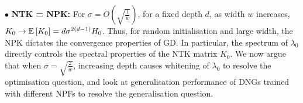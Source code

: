 $\bullet$ \textbf{NTK = NPK:} For $\sigma=O\left(\sqrt{\frac{1}{w}}\right)$, for a fixed depth $d$, as width $w$ increases, $K_0\rightarrow\mathbb{E}\left[K_0\right]=d\sigma^{2(d-1)}H_0$. Thus, for random initialisation and large width, the NPK dictates the convergence properties of GD. In particular, the spectrum of $\lambda_0$ directly controls the spectral properties of the NTK matrix $K_0$. We now argue that when $\sigma=\sqrt{\frac{2}{w}}$, increasing depth causes whitening of $\lambda_0$ to resolve the optimisation question, and look at generalisation performance of DNGs trained with different NPFs to resolve the generalisation question.

